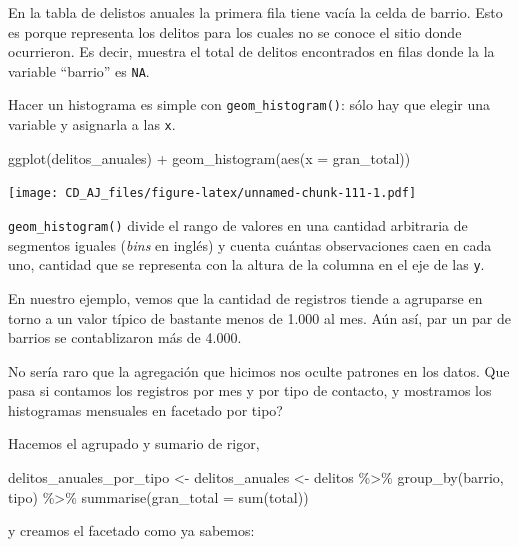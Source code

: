 \documentclass[
]{book}
\newenvironment{Shaded}{\begin{snugshade}}{\end{snugshade}}
\newcommand{\AttributeTok}[1]{\textcolor[rgb]{0.77,0.63,0.00}{#1}}
\newcommand{\FunctionTok}[1]{\textcolor[rgb]{0.00,0.00,0.00}{#1}}
\newcommand{\NormalTok}[1]{#1}
\newcommand{\OtherTok}[1]{\textcolor[rgb]{0.56,0.35,0.01}{#1}}
\newcommand{\SpecialCharTok}[1]{\textcolor[rgb]{0.00,0.00,0.00}{#1}}
\begin{document}
En la tabla de delistos anuales la primera fila tiene vacía la celda de barrio. Esto es porque representa los delitos para los cuales no se conoce el sitio donde ocurrieron. Es decir, muestra el total de delitos encontrados en filas donde la la variable ``barrio'' es \texttt{NA}.

Hacer un histograma es simple con \texttt{geom\_histogram()}: sólo hay que elegir una variable y asignarla a las \texttt{x}.

\begin{Shaded}
\begin{Highlighting}[]
\FunctionTok{ggplot}\NormalTok{(delitos\_anuales) }\SpecialCharTok{+} 
    \FunctionTok{geom\_histogram}\NormalTok{(}\FunctionTok{aes}\NormalTok{(}\AttributeTok{x =}\NormalTok{ gran\_total))}
\end{Highlighting}
\end{Shaded}

\texttt{[image: CD\_AJ\_files/figure-latex/unnamed-chunk-111-1.pdf]}

\texttt{geom\_histogram()} divide el rango de valores en una cantidad arbitraria de segmentos iguales (\emph{bins} en inglés) y cuenta cuántas observaciones caen en cada uno, cantidad que se representa con la altura de la columna en el eje de las \texttt{y}.

En nuestro ejemplo, vemos que la cantidad de registros tiende a agruparse en torno a un valor típico de bastante menos de 1.000 al mes. Aún así, par un par de barrios se contablizaron más de 4.000.

No sería raro que la agregación que hicimos nos oculte patrones en los datos. Que pasa si contamos los registros por mes y por tipo de contacto, y mostramos los histogramas mensuales en facetado por tipo?

Hacemos el agrupado y sumario de rigor,

\begin{Shaded}
\begin{Highlighting}[]
\NormalTok{delitos\_anuales\_por\_tipo }\OtherTok{\textless{}{-}}\NormalTok{ delitos\_anuales }\OtherTok{\textless{}{-}}\NormalTok{ delitos }\SpecialCharTok{\%\textgreater{}\%} 
    \FunctionTok{group\_by}\NormalTok{(barrio, tipo) }\SpecialCharTok{\%\textgreater{}\%} 
    \FunctionTok{summarise}\NormalTok{(}\AttributeTok{gran\_total =} \FunctionTok{sum}\NormalTok{(total))}
\end{Highlighting}
\end{Shaded}

y creamos el facetado como ya sabemos:
\end{document}
